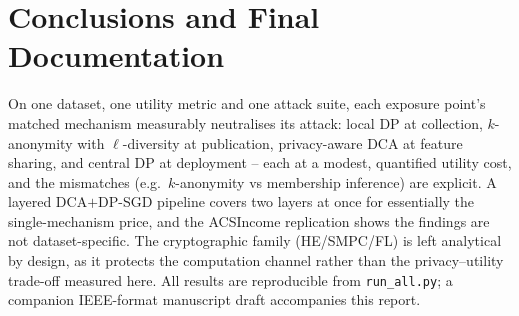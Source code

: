 \documentclass[11pt,a4paper]{article}
\begin{document}
\section{Conclusions and Final Documentation}\label{sec:concl}
On one dataset, one utility metric and one attack suite, each exposure point's
matched mechanism measurably neutralises its attack: local DP at collection,
$k$-anonymity with $\ell$-diversity at publication, privacy-aware DCA at feature
sharing, and central DP at deployment -- each at a modest, quantified utility
cost, and the mismatches (e.g.\ $k$-anonymity vs membership inference) are
explicit. A layered DCA$+$DP-SGD pipeline covers two layers at once for
essentially the single-mechanism price, and the ACSIncome replication shows the
findings are not dataset-specific. The cryptographic family (HE/SMPC/FL) is left
analytical by design, as it protects the computation channel rather than the
privacy--utility trade-off measured here. All results are reproducible from
\texttt{run\_all.py}; a companion IEEE-format manuscript draft accompanies this
report.



\end{document}
